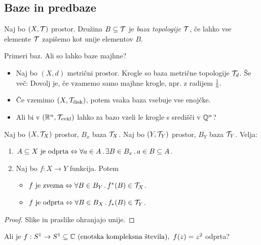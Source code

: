 \subsection{Baze in predbaze}
\begin{definicija}
    Naj bo $(X, \mathcal{T})$ prostor. Družina $B \subseteq \mathcal{T}$ je \emph{baza topologije $\mathcal{T}$}, če lahko vse elemente $\mathcal{T}$ zapišemo kot unije elementov $B$.
\end{definicija}

\begin{primer}
    Primeri baz. Ali so lahko baze majhne?
    \begin{itemize}
        \item Naj bo $(X, d)$ metrični prostor. Krogle so baza metrične topologije $\mathcal{T}_d$. Še več: Dovolj je, če vzamemo samo majhne krogle, npr. z radijem $\frac{1}{n}$.
        \item Če vzemimo $(X, \mathcal{T}_\text{disk})$, potem vsaka baza vsebuje vse enojčke.
        \item Ali bi v $(\mathbb{R}^n, \mathcal{T}_\text{evkl})$ lahko za bazo vzeli le krogle s središči v $\mathbb{Q}^n$?
    \end{itemize}
\end{primer}

\begin{trditev}
    Naj bo $(X, \mathcal{T}_X)$ prostor, $B_x$ baza $\mathcal{T}_X$. Naj bo $(Y, \mathcal{T}_Y)$ prostor, $B_Y$ baza $\mathcal{T}_Y$. Velja:
    \begin{enumerate}
        \item $A \subseteq X \text{ je odprta} \Leftrightarrow \forall a \in A \,.\, \exists B \in B_x \,.\, a \in B \subseteq A$.
        \item Naj bo $f: X \to Y$ funkcija. Potem
        \begin{itemize}
            \item $f \text{ je zvezna} \Leftrightarrow \forall B \in B_Y \,.\, f^{*}(B) \in \mathcal{T}_X$.
            \item $f \text{ je odprta} \Leftrightarrow \forall B \in B_X \,.\, f_{*}(B) \in \mathcal{T}_Y$.
        \end{itemize}
    \end{enumerate}
\end{trditev}

\begin{proof}
    Slike in praslike ohranjajo unije.
\end{proof}

\begin{primer}
    Ali je $f: S^1 \to S^1 \subseteq \mathbb{C} \text{ (enotska kompleksna števila)}, \ f(z) = z^2$ odprta?
\end{primer}

